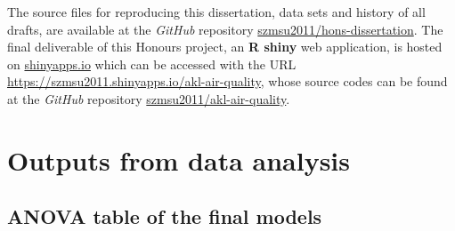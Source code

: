 \documentclass{aucklandthesis}
\begin{document}
The source files for reproducing this dissertation, data sets and history of all drafts, are available at the \emph{GitHub} repository \href{https://github.com/szmsu2011/hons-dissertation}{szmsu2011/hons-dissertation}. The final deliverable of this Honours project, an \textbf{R shiny} web application, is hosted on \href{https://www.shinyapps.io}{shinyapps.io} which can be accessed with the URL \url{https://szmsu2011.shinyapps.io/akl-air-quality}, whose source codes can be found at the \emph{GitHub} repository \href{https://github.com/szmsu2011/akl-air-quality}{szmsu2011/akl-air-quality}.

\appendix

\hypertarget{ch:model-output}{%
\chapter{Outputs from data analysis}\label{ch:model-output}}

\hypertarget{anova-table-of-the-final-models}{%
\section{ANOVA table of the final models}\label{anova-table-of-the-final-models}}
\end{document}
